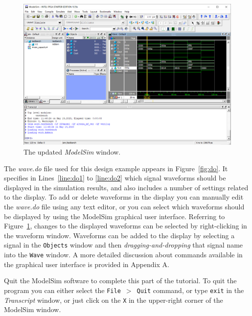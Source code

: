\documentclass[11pt, twoside, pdftex]{article}
\begin{document}
\begin{figure}[t]
	\begin{center}
		\includegraphics[width = .85\textwidth]{figures/gui2.png}
	\end{center}
		  \caption{The updated {\it ModelSim} window.}
	\label{fig:gui2}
\end{figure}
\newpage
\clearpage
\noindent
The {\it wave.do} file used for this design example appears in Figure~\ref{fig:do}. 
It specifies in Lines~\ref{line:do1} to \ref{line:do2}
which signal waveforms should be displayed in the simulation results, and 
also includes a number of settings related to the display. To add or delete waveforms 
in the display you can manually edit the {\it wave.do} file using any text editor, 
or you can select which waveforms should be displayed by using the ModelSim graphical 
user interface. Referring to Figure~\ref{fig:gui2}, changes to the displayed waveforms 
can be selected by right-clicking in the waveform window. Waveforms can be added to 
the display by selecting a signal in the \texttt{Objects} window and then 
{\it dragging-and-dropping} that signal name into the \texttt{Wave} window. 
A more detailed discussion about commands
available in the graphical user interface is provided in Appendix A.

\noindent
Quit the ModelSim software to complete this part of the tutorial. To quit the program you 
can either select the \texttt{File}~$>$~\texttt{Quit} command, or 
type \texttt{exit} in the {\it Transcript}
window, or just click on the \texttt{X} in the upper-right corner of the ModelSim window.
\end{document}
